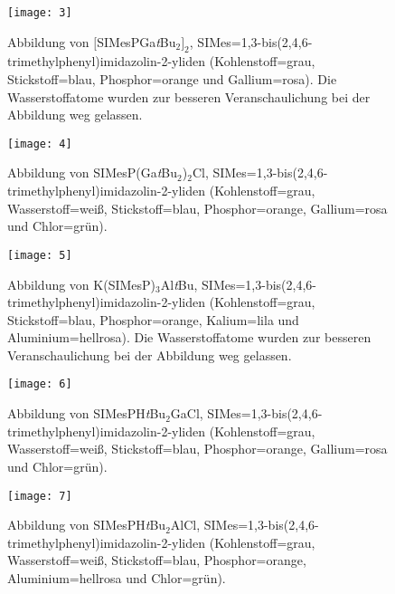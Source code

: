 \begin{figure}[ht!]
	\centering
	\texttt{[image: 3]}
	\captionsetup{figurewithin = chapter}
	\captionsetup{font=small, labelfont=bf}\caption[{Abbildung von $[$SIMesPGa\textit{t}Bu$_2]_2$}]{Abbildung von $[$SIMesPGa\textit{t}Bu$_2]_2$, SIMes=1,3-bis(2,4,6-tri\-me\-thyl\-phe\-nyl)imi\-da\-zo\-lin-2-yli\-den (Kohlenstoff=grau, Stickstoff=blau, Phosphor=orange und Gallium=rosa). Die Wasserstoffatome wurden zur besseren Veranschaulichung bei der Abbildung weg gelassen.}
\label{abb:cvh3}
\end{figure}

\begin{figure}[ht!]
	\centering
	\texttt{[image: 4]}
	\captionsetup{figurewithin = chapter}
	\captionsetup{font=small, labelfont=bf}\caption[Abbildung von SIMesP(Ga\textit{t}Bu$_2$)$_2$Cl]{Abbildung von SIMesP(Ga\textit{t}Bu$_2$)$_2$Cl, SIMes=1,3-bis(2,4,6-tri\-me\-thyl\-phe\-nyl)imi\-da\-zo\-lin-2-yli\-den (Kohlenstoff=grau, Wasserstoff=weiß, Stickstoff=blau, Phosphor=orange, Gallium=rosa und Chlor=grün).}
\label{abb:cvh4}
\end{figure}

\begin{figure}[ht!]
	\centering
	\texttt{[image: 5]}
	\captionsetup{figurewithin = chapter}
	\captionsetup{font=small, labelfont=bf}\caption[Abbildung von K(SIMesP)$_3$Al\textit{t}Bu]{Abbildung von K(SIMesP)$_3$Al\textit{t}Bu, SIMes=1,3-bis(2,4,6-tri\-me\-thyl\-phe\-nyl)imi\-da\-zo\-lin-2-yli\-den (Kohlenstoff=grau, Stickstoff=blau, Phosphor=orange, Kalium=lila und Aluminium=hellrosa). Die Wasserstoffatome wurden zur besseren Veranschaulichung bei der Abbildung weg gelassen.}
\label{abb:cvh5}
\end{figure}

\begin{figure}[ht!]
	\centering
	\texttt{[image: 6]}
	\captionsetup{figurewithin = chapter}
	\captionsetup{font=small, labelfont=bf}\caption[Abbildung von SIMesPH\textit{t}Bu$_2$GaCl]{Abbildung von SIMesPH\textit{t}Bu$_2$GaCl, SIMes=1,3-bis(2,4,6-tri\-me\-thyl\-phe\-nyl)imi\-da\-zo\-lin-2-yli\-den (Kohlenstoff=grau, Wasserstoff=weiß, Stickstoff=blau, Phosphor=orange, Gallium=rosa und Chlor=grün).}
\label{abb:cvh6}
\end{figure}

\begin{figure}[ht!]
	\centering
	\texttt{[image: 7]}
	\captionsetup{figurewithin = chapter}
	\captionsetup{font=small, labelfont=bf}\caption[Abbildung von SIMesPH\textit{t}Bu$_2$AlCl]{Abbildung von SIMesPH\textit{t}Bu$_2$AlCl, SIMes=1,3-bis(2,4,6-tri\-me\-thyl\-phe\-nyl)imi\-da\-zo\-lin-2-yli\-den (Kohlenstoff=grau, Wasserstoff=weiß, Stickstoff=blau, Phosphor=orange, Aluminium=hellrosa und Chlor=grün).}
\label{abb:cvh7}
\end{figure}


